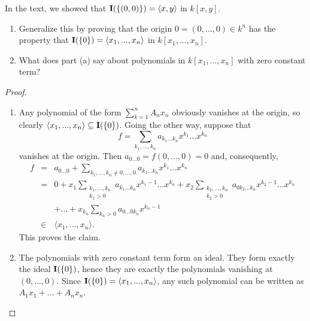 \begin{exercise}{18}
In the text, we showed that $\mathbf{I}(\{(0,0)\}) = \langle x,y\rangle$ in $k[x,y]$.
\begin{enumerate}
    \item Generalize this by proving that the origin $0 = (0,...,0)\in k^n$ has the property that $\mathbf{I}(\{0\}) = \langle x_1,...,x_n\rangle$ in $k[x_1,...,x_n]$.
    \item What does part (a) say about polynomials in $k[x_1,...,x_n]$ with zero constant term?
\end{enumerate}
\end{exercise}
\begin{proof}
    \begin{enumerate}
        \item Any polynomial of the form $\sum_{k=1}^n A_n x_n$ obviously vanishes at the origin, so clearly $\langle x_1,...,x_n\rangle \subseteq \mathbf{I}(\{0\})$. Going the other way, suppose that
        $$f = \sum_{k_1,...,k_n} a_{k_1...k_n} x^{k_1} ... x^{k_n}$$
        vanishes at the origin. Then $a_{0...0} = f(0,...,0) = 0$ and, consequently,
        \begin{eqnarray*}
            f
            & = & a_{0...0} + \sum_{k_1,...,k_n\neq 0,...,0} a_{k_1...k_n} x^{k_1}...x^{k_n}\\
            & = & 0 + x_1 \sum_{\substack{k_1,...,k_n\\ k_1>0}} a_{k_1...k_n} x^{k_1-1}...x^{k_n} + x_2\sum_{\substack{k_2,...,k_n\\ k_2 > 0}} a_{0 k_2...k_n} x^{k_2 - 1}...x^{k_n}\\
            & & + ... + x_{k_n}\sum_{k_n>0} a_{0...0k_n} x^{k_n - 1}\\
            & \in & \langle x_1,...,x_n\rangle.
        \end{eqnarray*}
        This proves the claim.
        \item The polynomials with zero constant term form an ideal. They form exactly the ideal $\mathbf{I}(\{0\})$, hence they are exactly the polynomials vanishing at $(0,...,0)$. Since $\mathbf{I}(\{0\}) = \langle x_1,...,x_n\rangle$, any such polynomial can be written as $A_1 x_1 + ... + A_n x_n$.
    \end{enumerate}
\end{proof}

